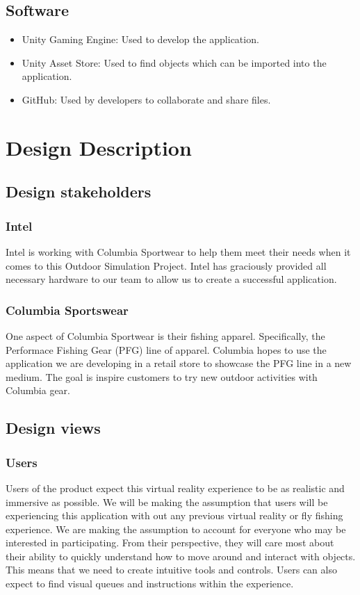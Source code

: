 \documentclass[10pt,journal,compsoc,onecolumn, draftclsnofoot]{IEEEtran}
\begin{document}
\subsection{Software}
\begin{itemize}
  \item Unity Gaming Engine: Used to develop the application.
  \item Unity Asset Store: Used to find objects which can be imported into the application.
  \item GitHub: Used by developers to collaborate and share files.
\end{itemize}


\section{Design Description}

\subsection{Design stakeholders}
\subsubsection{Intel}
Intel is working with Columbia Sportwear to help them meet their needs when it comes to this Outdoor Simulation Project.
Intel has graciously provided all necessary hardware to our team to allow us to create a successful application.

\subsubsection{Columbia Sportswear}
One aspect of Columbia Sportwear is their fishing apparel.
Specifically, the Performace Fishing Gear (PFG) line of apparel.
Columbia hopes to use the application we are developing in a retail store to showcase the PFG line in a new medium.
The goal is inspire customers to try new outdoor activities with Columbia gear.

\subsection{Design views}
\subsubsection{Users}
Users of the product expect this virtual reality experience to be as realistic and immersive as possible. We will be making the assumption that users will be experiencing this application with out any previous virtual reality or fly fishing experience. We are making the assumption to account for everyone who may be interested in participating. From their perspective, they will care most about their ability to quickly understand how to move around and interact with objects. This means that we need to create intuitive tools and controls. Users can also expect to find visual queues and instructions within the experience.
\end{document}
